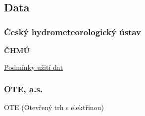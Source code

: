 \subsection{Data}

\subsubsection*{Český hydrometeorologický ústav}

\textbf{ČHMÚ}

\href{https://www.chmi.cz/files/portal/docs/meteo/ok/open_data_2023/Podminky_uziti_udaju.pdf}{Podmínky užití dat}

\subsubsection*{OTE, a.s.}

OTE (Otevřený trh s elektřinou)
